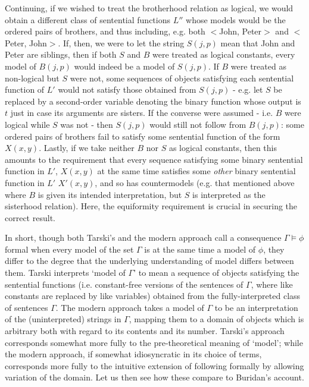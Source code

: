 \documentclass[]{article}
\begin{document}
Continuing, if we wished to treat the brotherhood relation as logical, we would obtain a different class of sentential functions $L''$ whose models would be the ordered pairs of brothers, and thus including, e.g. both $<$John, Peter$>$ and $<$Peter, John$>$. If, then, we were to let the string $S(j, p)$ mean that John and Peter are siblings, then if both $S$ and $B$ were treated as logical constants, every model of $B(j, p)$  would indeed be a model of $S(j, p)$. If $B$ were treated as non-logical but $S$ were not, some sequences of objects satisfying each sentential function of $L'$ would not satisfy those obtained from $S(j, p)$ - e.g. let $S$ be replaced by a second-order variable denoting the binary function whose output is $t$ just in case its arguments are sisters. If the converse were assumed - i.e. $B$ were logical while $S$ was not - then $S(j, p)$ would still not follow from $B(j, p)$: some ordered pairs of brothers fail to satisfy some sentential function of the form $X(x, y)$. Lastly, if we take neither $B$ nor $S$ as logical constants, then this amounts to the requirement that every sequence satisfying some binary sentential function in $L'$, $X(x, y)$ at the same time satisfies some \textit{other} binary sentential function in $L'$ $X'(x, y)$, and so has countermodels (e.g. that mentioned above where $B$ is given its intended interpretation, but $S$ is interpreted as the sisterhood relation). Here, the equiformity requirement is crucial in securing the correct result. 

In short, though both Tarski's and the modern approach call a consequence $\Gamma \models \phi$ formal when every model of the set $\Gamma$ is at the same time a model of $\phi$, they differ to the degree that the underlying understanding of model differs between them. Tarski interprets `model of $\Gamma$' to mean a sequence of objects satisfying the sentential functions (i.e. constant-free versions of the sentences of $\Gamma$, where like constants are replaced by like variables) obtained from the fully-interpreted class of sentences $\Gamma$. The modern approach takes a model of $\Gamma$ to be an interpretation of the (uninterpreted) strings in $\Gamma$, mapping them to a domain of objects which is arbitrary both with regard to its contents and its number. Tarski's approach corresponds somewhat more fully to the pre-theoretical meaning of `model'; while the modern approach, if somewhat idiosyncratic in its choice of terms, corresponds more fully to the intuitive extension of following formally by allowing variation of the domain. Let us then see how these compare to Buridan's account.
\end{document}
